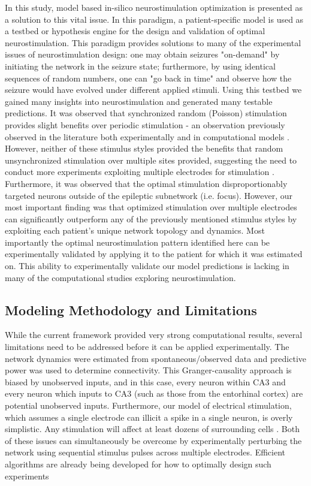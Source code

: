 \documentclass[11pt,a4paper,final]{article}
\begin{document}
In this study, model based in-silico neurostimulation optimization is presented as a solution to this vital issue.
In this paradigm, a patient-specific model is used as a testbed or hypothesis engine for the design and validation of optimal neurostimulation.
This paradigm provides solutions to many of the experimental issues of neurostimulation design: one may obtain seizures "on-demand" by initiating the network in the seizure state; furthermore, by using identical sequences of random numbers, one can "go back in time" and observe how the seizure would have evolved under different applied stimuli.
Using this testbed we gained many insights into neurostimulation and generated many testable predictions.
It was observed that synchronized random (Poisson) stimulation provides slight benefits over periodic stimulation - an observation previously observed in the literature both experimentally and in computational models \citep{wyckhuys10,buffel14}.
However, neither of these stimulus styles provided the benefits that random unsynchronized stimulation over multiple sites provided, suggesting the need to conduct more experiments exploiting multiple electrodes for stimulation \citep{cook13,van14}.
Furthermore, it was observed that the optimal stimulation disproportionably targeted neurons outside of the epileptic subnetwork (i.e. focus).
However, our most important finding was that optimized stimulation over multiple electrodes can significantly outperform any of the previously mentioned stimulus styles by exploiting each patient's unique network topology and dynamics.
Most importantly the optimal neurostimulation pattern identified here can be experimentally validated by applying it to the patient for which it was estimated on.
This ability to experimentally validate our model predictions is lacking in many of the computational studies exploring neurostimulation.

\subsection{Modeling Methodology and Limitations}

While the current framework provided very strong computational results, several limitations need to be addressed before it can be applied experimentally.
The network dynamics were estimated from spontaneous/observed data and predictive power was used to determine connectivity.
This Granger-causality approach is biased by unobserved inputs, and in this case, every neuron within CA3 and every neuron which inputs to CA3 (such as those from the entorhinal cortex) are potential unobserved inputs.
Furthermore, our model of electrical stimulation, which assumes a single electrode can illicit a spike in a single neuron, is overly simplistic.
Any stimulation will affect at least dozens of surrounding cells \citep{grill05,desai14}.
Both of these issues can simultaneously be overcome by experimentally perturbing the network using sequential stimulus pulses across multiple electrodes.
Efficient algorithms are already being developed for how to optimally design such experiments \citep{lepage13,kim14}
\end{document}
